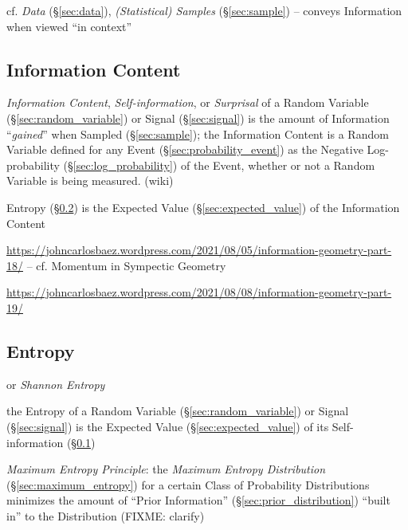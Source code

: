 \fist cf. \emph{Data} (\S\ref{sec:data}), \emph{(Statistical) Samples}
(\S\ref{sec:sample}) -- conveys Information when viewed ``in context''



\subsection{Information Content}\label{sec:information_content}

\emph{Information Content}, \emph{Self-information}, or \emph{Surprisal} of a
Random Variable (\S\ref{sec:random_variable}) or Signal (\S\ref{sec:signal}) is
the amount of Information ``\emph{gained}'' when Sampled (\S\ref{sec:sample});
the Information Content is a Random Variable defined for any Event
(\S\ref{sec:probability_event}) as the Negative Log-probability
(\S\ref{sec:log_probability}) of the Event, whether or not a Random Variable is
being measured. (wiki)

Entropy (\S\ref{sec:entropy}) is the Expected Value
(\S\ref{sec:expected_value}) of the Information Content

\url{https://johncarlosbaez.wordpress.com/2021/08/05/information-geometry-part-18/}
-- cf. Momentum in Sympectic Geometry

\url{https://johncarlosbaez.wordpress.com/2021/08/08/information-geometry-part-19/}



\subsection{Entropy}\label{sec:entropy}

or \emph{Shannon Entropy}

the Entropy of a Random Variable (\S\ref{sec:random_variable}) or Signal
(\S\ref{sec:signal}) is the Expected Value (\S\ref{sec:expected_value}) of its
Self-information (\S\ref{sec:information_content})

\emph{Maximum Entropy Principle}: the \emph{Maximum Entropy Distribution}
(\S\ref{sec:maximum_entropy}) for a certain Class of Probability Distributions
minimizes the amount of ``Prior Information'' (\S\ref{sec:prior_distribution})
``built in'' to the Distribution
(FIXME: clarify)

